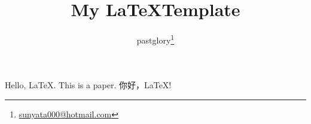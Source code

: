 \documentclass[UTF8]{ctexart}
\title {My \LaTeX\space Template}
\author{pastglory\thanks{\href{mailto:sunyata000@hotmail.com}{sunyata000@hotmail.com}}}
\begin{document}
\maketitle



    Hello, \LaTeX.
    This is a paper\cite{zhang2020sparch}.
    你好，\LaTeX!



\end{document}
